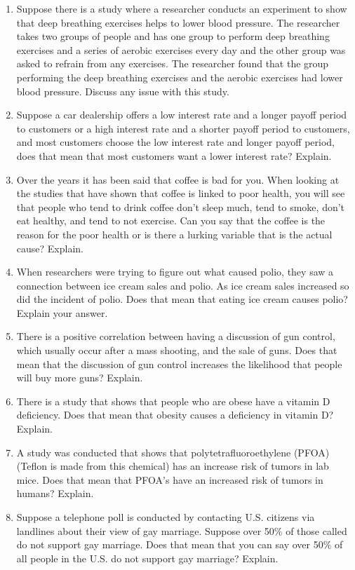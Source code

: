 \documentclass[]{book}
\begin{document}
\begin{enumerate}
\def\labelenumi{\arabic{enumi}.}
\item
  Suppose there is a study where a researcher conducts an experiment to show that deep breathing exercises helps to lower blood pressure. The researcher takes two groups of people and has one group to perform deep breathing exercises and a series of aerobic exercises every day and the other group was asked to refrain from any exercises. The researcher found that the group performing the deep breathing exercises and the aerobic exercises had lower blood pressure. Discuss any issue with this study.
\item
  Suppose a car dealership offers a low interest rate and a longer payoff period to customers or a high interest rate and a shorter payoff period to customers, and most customers choose the low interest rate and longer payoff period, does that mean that most customers want a lower interest rate? Explain.
\item
  Over the years it has been said that coffee is bad for you. When looking at the studies that have shown that coffee is linked to poor health, you will see that people who tend to drink coffee don't sleep much, tend to smoke, don't eat healthy, and tend to not exercise. Can you say that the coffee is the reason for the poor health or is there a lurking variable that is the actual cause? Explain.
\item
  When researchers were trying to figure out what caused polio, they saw a connection between ice cream sales and polio. As ice cream sales increased so did the incident of polio. Does that mean that eating ice cream causes polio? Explain your answer.
\item
  There is a positive correlation between having a discussion of gun control, which usually occur after a mass shooting, and the sale of guns. Does that mean that the discussion of gun control increases the likelihood that people will buy more guns? Explain.
\item
  There is a study that shows that people who are obese have a vitamin D deficiency. Does that mean that obesity causes a deficiency in vitamin D? Explain.
\item
  A study was conducted that shows that polytetrafluoroethylene (PFOA) (Teflon is made from this chemical) has an increase risk of tumors in lab mice. Does that mean that PFOA's have an increased risk of tumors in humans? Explain.
\item
  Suppose a telephone poll is conducted by contacting U.S. citizens via landlines about their view of gay marriage. Suppose over 50\% of those called do not support gay marriage. Does that mean that you can say over 50\% of all people in the U.S. do not support gay marriage? Explain.

\end{enumerate}
\end{document}
